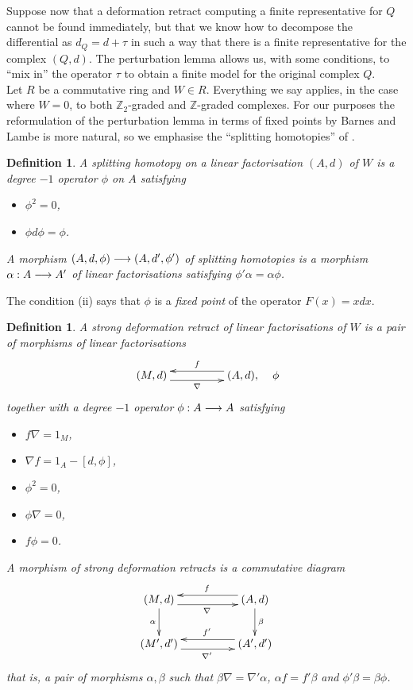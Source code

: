 \documentclass[english,letter paper,12pt,leqno]{article}
\theoremstyle{example}
\newtheorem{definition}[theorem]{Definition}
\numberwithin{equation}{section}
\begin{document}
Suppose now that a deformation retract computing a finite representative for $Q$ cannot be found immediately, but that we know how to decompose the differential as $d_Q = d + \tau$ in such a way that there is a finite representative for the complex $(Q,d)$. The perturbation lemma allows us, with some conditions, to ``mix in'' the operator $\tau$ to obtain a finite model for the original complex $Q$.
\\

Let $R$ be a commutative ring and $W \in R$. Everything we say applies, in the case where $W = 0$, to both $\mathbb{Z}_2$-graded and $\mathbb{Z}$-graded complexes.  For our purposes the reformulation of the perturbation lemma in terms of fixed points by Barnes and Lambe is more natural, so we emphasise the ``splitting homotopies'' of \cite{barneslambe}.

\begin{definition} A \emph{splitting homotopy} on a linear factorisation $(A,d)$ of $W$ is a degree $-1$ operator $\phi$ on $A$ satisfying
\begin{itemize}
\item[(i)] $\phi^2 = 0$,
\item[(ii)] $\phi d \phi = \phi$.
\end{itemize}
A \emph{morphism} $(A,d, \phi) \longrightarrow (A,d',\phi')$ of splitting homotopies is a morphism $\alpha: A \longrightarrow A'$ of linear factorisations satisfying $\phi' \alpha = \alpha \phi$.
\end{definition}

The condition (ii) says that $\phi$ is a \emph{fixed point} of the operator $F(x) = x d x$.

\begin{definition} A \emph{strong deformation retract} of linear factorisations of $W$ is a pair of morphisms of linear factorisations
\begin{equation}\label{eq:defn_sdr}
\xymatrix@C+2pc{
(M,d) \ar@<-1ex>[r]_\nabla & (A,d), \ar@<-1ex>[l]_f
} \quad \phi
\end{equation}
together with a degree $-1$ operator $\phi: A \longrightarrow A$ satisfying
\begin{itemize}
\item[(i)] $f \nabla = 1_M$,
\item[(ii)] $\nabla f = 1_A - [d, \phi]$,
\item[(iii)] $\phi^2 = 0$,
\item[(iv)] $\phi \nabla = 0$,
\item[(v)] $f \phi = 0$.
\end{itemize}
A \emph{morphism} of strong deformation retracts is a commutative diagram
\[
\xymatrix@C+2pc{
(M,d) \ar[d]_{\alpha} \ar@<-1ex>[r]_\nabla & (A,d)\ar[d]^\beta \ar@<-1ex>[l]_f\\
(M',d') \ar@<-1ex>[r]_{\nabla'} & (A',d') \ar@<-1ex>[l]_{f'}
}
\]
that is, a pair of morphisms $\alpha, \beta$ such that $\beta \nabla = \nabla' \alpha$, $\alpha f = f' \beta$ and $\phi' \beta = \beta \phi$.
\end{definition}
\end{document}
